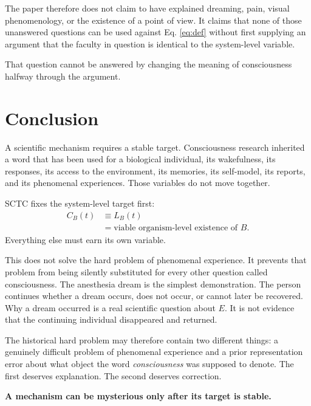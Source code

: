The paper therefore does not claim to have explained dreaming, pain, visual phenomenology, or the existence of a point of view. It claims that none of those unanswered questions can be used against Eq. \ref{eq:def} without first supplying an argument that the faculty in question is identical to the system-level variable.


That question cannot be answered by changing the meaning of consciousness halfway through the argument.

\section{Conclusion}
A scientific mechanism requires a stable target. Consciousness research inherited a word that has been used for a biological individual, its wakefulness, its responses, its access to the environment, its memories, its self-model, its reports, and its phenomenal experiences. Those variables do not move together.

SCTC fixes the system-level target first:
\begin{equation}
\boxed{\begin{aligned}
C_B(t)&\equiv L_B(t)\\
&=\text{viable organism-level existence of }B.
\end{aligned}}
\end{equation}
Everything else must earn its own variable.

This does not solve the hard problem of phenomenal experience. It prevents that problem from being silently substituted for every other question called consciousness. The anesthesia dream is the simplest demonstration. The person continues whether a dream occurs, does not occur, or cannot later be recovered. Why a dream occurred is a real scientific question about $E$. It is not evidence that the continuing individual disappeared and returned.

The historical hard problem may therefore contain two different things: a genuinely difficult problem of phenomenal experience and a prior representation error about what object the word \emph{consciousness} was supposed to denote. The first deserves explanation. The second deserves correction.

\begin{center}
\small\bfseries A mechanism can be mysterious only after its target is stable.
\end{center}

